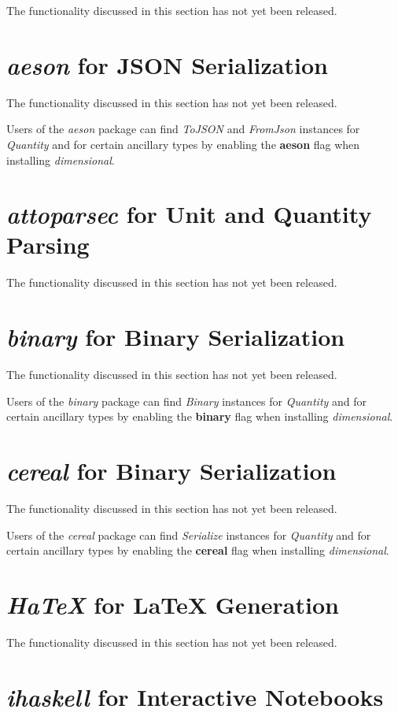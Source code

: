 \documentclass[11pt]{report}
\newcommand{\packagename}[1]{\textit{#1}}
\newcommand{\thispackage}{\packagename{dimensional}}
\newcommand{\classname}[1]{\textit{#1}}
\newcommand{\typename}[1]{\textit{#1}}
\newcommand{\flag}[1]{\textbf{#1}}
\newcommand{\prerelease}{\begin{tcolorbox}
The functionality discussed in this section has not yet been released.
\end{tcolorbox}}
\begin{document}
\prerelease{}

\section{\packagename{aeson} for JSON Serialization}

\prerelease{}

Users of the \packagename{aeson} package can find \classname{ToJSON}
and \classname{FromJson} instances for \typename{Quantity} and for certain ancillary types by
enabling the \flag{aeson} flag when installing \thispackage{}.

\section{\packagename{attoparsec} for Unit and Quantity Parsing}

\prerelease{}

\section{\packagename{binary} for Binary Serialization}

\prerelease{}

Users of the \packagename{binary} package can find \classname{Binary}
instances for \typename{Quantity} and for certain ancillary types by
enabling the \flag{binary} flag when installing \thispackage{}.

\section{\packagename{cereal} for Binary Serialization}

\prerelease{}

Users of the \packagename{cereal} package can find \classname{Serialize}
instances for \typename{Quantity} and for certain ancillary types by
enabling the \flag{cereal} flag when installing \thispackage{}.

\section{\packagename{HaTeX} for \LaTeX{} Generation}

\prerelease{}

\section{\packagename{ihaskell} for Interactive Notebooks}
\end{document}
